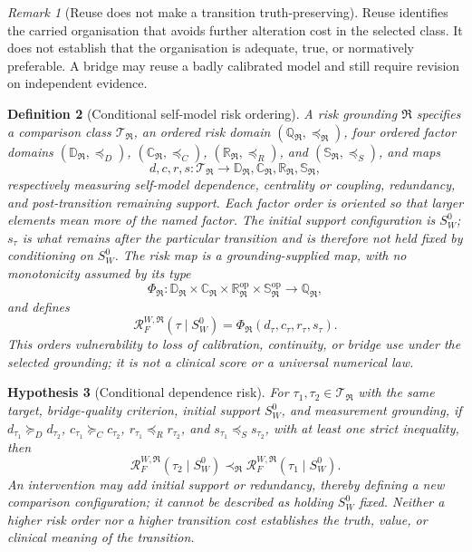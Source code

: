 \documentclass[11pt,a4paper]{article}
\newtheorem{definition}{Definition}[section]
\newtheorem{hypothesis}[definition]{Hypothesis}
\theoremstyle{remark}
\newtheorem{remark}[definition]{Remark}
\newcommand{\Risk}{\mathcal R}
\begin{document}
\begin{remark}[Reuse does not make a transition truth-preserving]
Reuse identifies the carried organisation that avoids further alteration cost in
the selected class. It does not establish that the organisation is adequate,
true, or normatively preferable. A bridge may reuse a badly calibrated model and
still require revision on independent evidence.
\end{remark}

\begin{definition}[Conditional self-model risk ordering]
A \emph{risk grounding} $\mathfrak R$ specifies a comparison class
$\mathcal T_{\mathfrak R}$, an ordered risk domain
$(\mathbb Q_{\mathfrak R},\preceq_{\mathfrak R})$, four ordered factor domains
$(\mathbb D_{\mathfrak R},\preceq_D)$,
$(\mathbb C_{\mathfrak R},\preceq_C)$,
$(\mathbb R_{\mathfrak R},\preceq_R)$, and
$(\mathbb S_{\mathfrak R},\preceq_S)$, and maps
\[
 d,c,r,s:\mathcal T_{\mathfrak R}
 \longrightarrow
 \mathbb D_{\mathfrak R},\mathbb C_{\mathfrak R},
 \mathbb R_{\mathfrak R},\mathbb S_{\mathfrak R},
\]
respectively measuring self-model dependence, centrality or coupling,
redundancy, and post-transition remaining support. Each factor order is oriented
so that larger elements mean more of the named factor. The initial support
configuration is $S_W^0$; $s_\tau$ is what remains after the particular
transition and is therefore not held fixed by conditioning on $S_W^0$. The risk
map is a grounding-supplied map, with no monotonicity assumed by its type
\[
 \Phi_{\mathfrak R}:
 \mathbb D_{\mathfrak R}\times\mathbb C_{\mathfrak R}
 \times\mathbb R_{\mathfrak R}^{\mathrm{op}}
 \times\mathbb S_{\mathfrak R}^{\mathrm{op}}
 \longrightarrow\mathbb Q_{\mathfrak R},
\]
and defines
\[
 \Risk^{W,\mathfrak R}_F(\tau\mid S_W^0)=
 \Phi_{\mathfrak R}(d_\tau,c_\tau,r_\tau,s_\tau).
\]
This orders vulnerability to loss of calibration, continuity, or bridge use under
the selected grounding; it is not a clinical score or a universal numerical law.
\end{definition}

\begin{hypothesis}[Conditional dependence risk]\label{hyp:conditional-risk}
For $\tau_1,\tau_2\in\mathcal T_{\mathfrak R}$ with the same target,
bridge-quality criterion, initial support $S_W^0$, and measurement grounding,
if $d_{\tau_1}\succeq_D d_{\tau_2}$,
$c_{\tau_1}\succeq_C c_{\tau_2}$,
$r_{\tau_1}\preceq_R r_{\tau_2}$, and
$s_{\tau_1}\preceq_S s_{\tau_2}$, with at least one strict inequality, then
\[
 \Risk^{W,\mathfrak R}_F(\tau_2\mid S_W^0)
 \prec_{\mathfrak R}
 \Risk^{W,\mathfrak R}_F(\tau_1\mid S_W^0).
\]
An intervention may add initial support or redundancy, thereby defining a new
comparison configuration; it cannot be described as holding $S_W^0$ fixed.
Neither a higher risk order nor a higher transition cost establishes the truth,
value, or clinical meaning of the transition.
\end{hypothesis}
\end{document}
